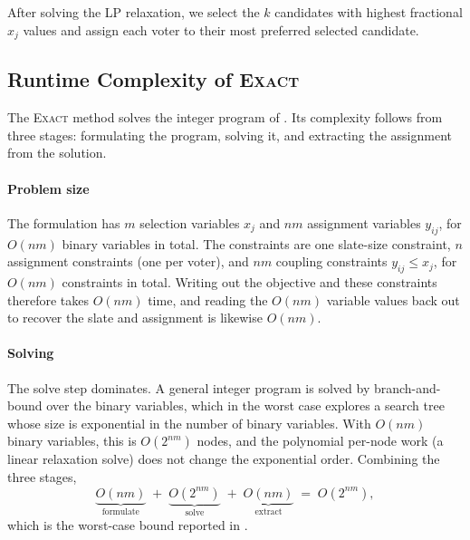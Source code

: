 \documentclass[11pt]{article}
\newcommand{\Exact}{\textsc{Exact}}
\begin{document}
After solving the LP relaxation, we select the \(k\) candidates with highest fractional \(x_j\) values and assign each voter to their most preferred selected candidate.




\subsection{Runtime Complexity of \Exact{}} \label{app:brute-force-vs-exact}
The \Exact{} method solves the integer program of . Its complexity follows from three stages: formulating the program, solving it, and extracting the assignment from the solution.

\paragraph{Problem size} The formulation has $m$ selection variables $x_j$ and $nm$ assignment variables $y_{ij}$, for $O(nm)$ binary variables in total. The constraints are one slate-size constraint, $n$ assignment constraints (one per voter), and $nm$ coupling constraints $y_{ij}\le x_j$, for $O(nm)$ constraints in total. Writing out the objective and these constraints therefore takes $O(nm)$ time, and reading the $O(nm)$ variable values back out to recover the slate and assignment is likewise $O(nm)$.

\paragraph{Solving} The solve step dominates. A general integer program is solved by branch-and-bound over the binary variables, which in the worst case explores a search tree whose size is exponential in the number of binary variables. With $O(nm)$ binary variables, this is $O(2^{nm})$ nodes, and the polynomial per-node work (a linear relaxation solve) does not change the exponential order. Combining the three stages,
\[
\underbrace{O(nm)}_{\text{formulate}} \;+\; \underbrace{O(2^{nm})}_{\text{solve}} \;+\; \underbrace{O(nm)}_{\text{extract}} \;=\; O(2^{nm}),
\]
which is the worst-case bound reported in .
\end{document}
